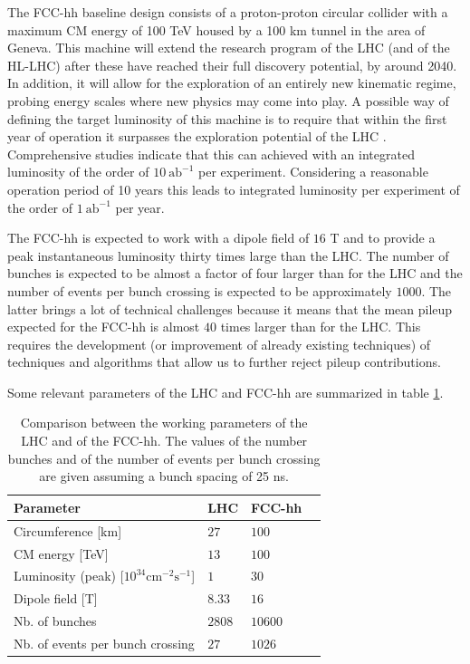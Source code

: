 The FCC-hh baseline design consists of a proton-proton circular collider with a maximum CM energy of 100 TeV housed by a 100 km tunnel in the area of Geneva. This machine will extend the research program of the LHC (and of the HL-LHC) after these have reached their full discovery potential, by around 2040. In addition, it will allow for the exploration of an entirely new kinematic regime, probing energy scales where new physics may come into play. A possible way of defining the target luminosity of this machine is to require that within the first year of operation it surpasses the exploration potential of the LHC \cite{FCClumi}. Comprehensive studies \cite{FCCphys,FCClumi} indicate that this can achieved with an integrated luminosity of the order of $10~\text{ab}^{-1}$ per experiment. Considering a reasonable operation period of 10 years this leads to integrated luminosity per experiment of the order of $1~\text{ab}^{-1}$ per year. 

The FCC-hh is expected to work with a dipole field of $16$ T and to provide a peak instantaneous luminosity thirty times large than the LHC. The number of bunches is expected to be almost a factor of four larger than for the LHC and the number of events per bunch crossing is expected to be approximately $1000$. The latter brings a lot of technical challenges because it means that the mean pileup expected for the FCC-hh is almost $40$ times larger than for the LHC. This requires the development (or improvement of already existing techniques) of techniques and algorithms that allow us to further reject pileup contributions. 

Some relevant parameters of the LHC and FCC-hh are summarized in table \ref{table:FCCpara}.

\renewcommand{\arraystretch}{1.2}

\begin{table}
	\centering
	\begin{tabular}{llll}
		\toprule 
		\textbf{Parameter} & \textbf{LHC} & \textbf{FCC-hh} &  \\
		\midrule
		Circumference [km] & $27$ & $100$ &   \\
		\rowcolor{black!7} CM energy [TeV]  & $13$ & $100$ &  \\
		Luminosity (peak) [$\mathrm{10^{34} cm^{-2} s^{-1}}$] & $1$ & $30$ &   \\
		\rowcolor{black!7} Dipole field [T]  & $8.33$ & $16$  &  \\
		Nb. of bunches & $2808$ & $10600$ &   \\
		\rowcolor{black!7} Nb. of events per bunch crossing  & $27$ & $1026$ &  \\
		\bottomrule
	\end{tabular}
	\caption{Comparison between the working parameters of the LHC and of the FCC-hh. The values of the number bunches and of the number of events per bunch crossing are given assuming a bunch spacing of 25 ns.}
	\label{table:FCCpara}
\end{table}

